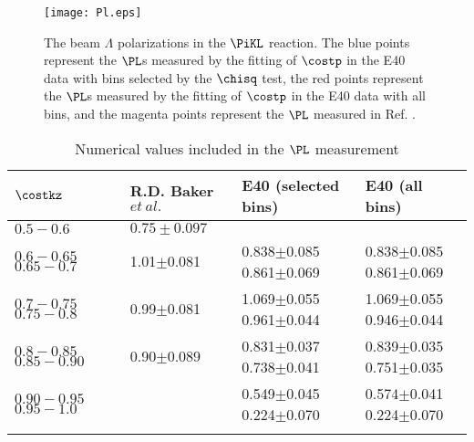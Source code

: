 \begin{figure}[h]
  \centering
  \texttt{[image: Pl.eps]}
  \caption{The beam $\Lambda$ polarizations in the $\PiKL$ reaction. The blue points represent the $\PL$s measured by the fitting of $\costp$ in the E40 data with bins selected by the $\chisq$ test, the red points represent the $\PL$s measured by the fitting of $\costp$ in the E40 data with all bins, and the magenta points represent the $\PL$ measured in Ref. \cite{Baker}.}
  \label{fig-Pl}
\end{figure}

\begin{table}[!h] 
  \begin{center}
  \caption{Numerical values included in the $\PL$ measurement}
    \begin{tabular}%
    {m{2cm} m{3cm} m{4cm} m{3cm}}
    $\costkz$ & R.D. Baker $et\ al.$ & E40 (selected bins) & E40 (all bins) \\
    \midrule\midrule
    $0.5-0.6$ & $0.75\pm0.097$ & & \\
    \midrule
    $0.6-0.65$ $0.65-0.7$ & 1.01$\pm$0.081 & 0.838$\pm$0.085 0.861$\pm$0.069 & 0.838$\pm$0.085 0.861$\pm$0.069 \\
    \midrule
    $0.7-0.75$ $0.75-0.8$ & 0.99$\pm$0.081 & 1.069$\pm$0.055 0.961$\pm$0.044 & 1.069$\pm$0.055 0.946$\pm$0.044 \\
    \midrule
    $0.8-0.85$ $0.85-0.90$ & 0.90$\pm$0.089 & 0.831$\pm$0.037 0.738$\pm$0.041 & 0.839$\pm$0.035 0.751$\pm$0.035 \\
    \midrule
    $0.90-0.95$ $0.95-1.0$ & & 0.549$\pm$0.045 0.224$\pm$0.070 & 0.574$\pm$0.041 0.224$\pm$0.070 \\
    \label{tab-Pl}
    \end{tabular}
  \end{center}
\end{table}
%
